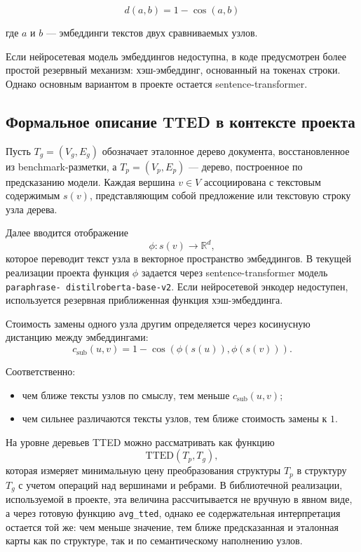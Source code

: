\documentclass[12pt,a4paper]{article}
\begin{document}
\[
d(a, b) = 1 - \cos(a, b)
\]

где $a$ и $b$ --- эмбеддинги текстов двух сравниваемых узлов.

Если нейросетевая модель эмбеддингов недоступна, в коде предусмотрен более простой
резервный механизм: хэш-эмбеддинг, основанный на токенах строки. Однако основным вариантом
в проекте остается sentence-transformer.

\subsection{Формальное описание TTED в контексте проекта}

Пусть $T_g = (V_g, E_g)$ обозначает эталонное дерево документа, восстановленное из
benchmark-разметки, а $T_p = (V_p, E_p)$ --- дерево, построенное по предсказанию модели.
Каждая вершина $v \in V$ ассоциирована с текстовым содержимым $s(v)$, представляющим
собой предложение или текстовую строку узла дерева.

Далее вводится отображение
\[
\phi: s(v) \rightarrow \mathbb{R}^d,
\]
которое переводит текст узла в векторное пространство эмбеддингов. В текущей реализации
проекта функция $\phi$ задается через sentence-transformer модель
\texttt{paraphrase- distilroberta-base-v2}. Если нейросетевой энкодер недоступен,
используется резервная приближенная функция хэш-эмбеддинга.

Стоимость замены одного узла другим определяется через косинусную дистанцию между
эмбеддингами:
\[
c_{\text{sub}}(u, v) = 1 - \cos(\phi(s(u)), \phi(s(v))).
\]

Соответственно:

\begin{itemize}
    \item чем ближе тексты узлов по смыслу, тем меньше $c_{\text{sub}}(u, v)$;
    \item чем сильнее различаются тексты узлов, тем ближе стоимость замены к $1$.
\end{itemize}

На уровне деревьев TTED можно рассматривать как функцию
\[
\mathrm{TTED}(T_p, T_g),
\]
которая измеряет минимальную цену преобразования структуры $T_p$ в структуру $T_g$ с
учетом операций над вершинами и ребрами. В библиотечной реализации, используемой в
проекте, эта величина рассчитывается не вручную в явном виде, а через готовую функцию
\texttt{avg\_tted}, однако ее содержательная интерпретация остается той же: чем меньше
значение, тем ближе предсказанная и эталонная карты как по структуре, так и по
семантическому наполнению узлов.
\end{document}
